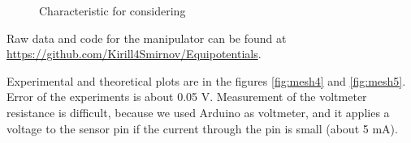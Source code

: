 \documentclass{article}
\begin{document}
\begin{figure}[htb!]
\begin{center}
\end{center}
\caption{Characteristic for considering}
\label{fig:VAC}
\end{figure}

Raw data and code for the manipulator can be found at \url{https://github.com/Kirill4Smirnov/Equipotentials}. \par

Experimental and theoretical plots are in the figures \ref{fig:mesh4} and \ref{fig:mesh5}. Error of the experiments is about 0.05 V. Measurement of the voltmeter resistance is difficult, because we used Arduino as voltmeter, and it applies a voltage to the sensor pin if the current through the pin is small (about 5 mA). \par
\end{document}
